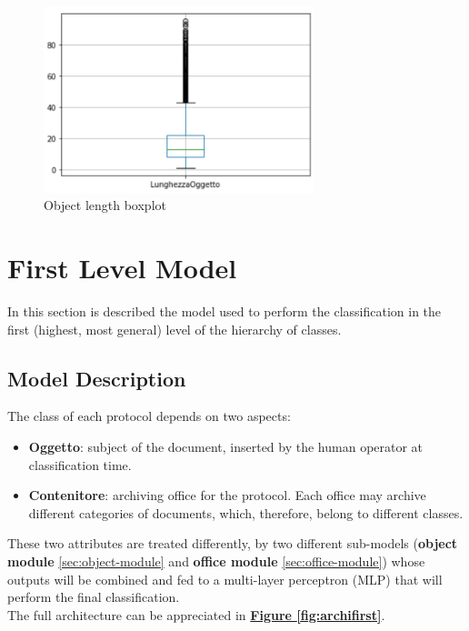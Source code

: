 \documentclass[12pt]{article}
\begin{document}
\begin{figure}[ht!]
    	    \begin{center}
        \includegraphics[width=0.7\textwidth]{object_length.png}
            \end{center}
        \label{fig:objectlength}
        \caption{Object length boxplot}
\end{figure}

\section{First Level Model}\label{sec:1lev-model}
In this section is described the model used to perform the classification in the first (highest, most general) level of the hierarchy of classes.

\subsection{Model Description}\label{sec:model-desc}
The class of each protocol depends on two aspects:
\begin{itemize}
    \item \textbf{Oggetto}: subject of the document, inserted by the human operator at classification time.
    \item \textbf{Contenitore}: archiving office for the protocol. Each office may archive different categories of documents, which, therefore, belong to different classes.
\end{itemize}
These two attributes are treated differently, by two different sub-models (\textbf{object module} \ref{sec:object-module} and \textbf{office module} \ref{sec:office-module}) whose outputs will be combined and fed to a multi-layer perceptron (MLP) that will perform the final classification. 
\\The full architecture can be appreciated in \hyperref[fig:archifirst]{\textbf{Figure \ref{fig:archifirst}}}.
\end{document}
